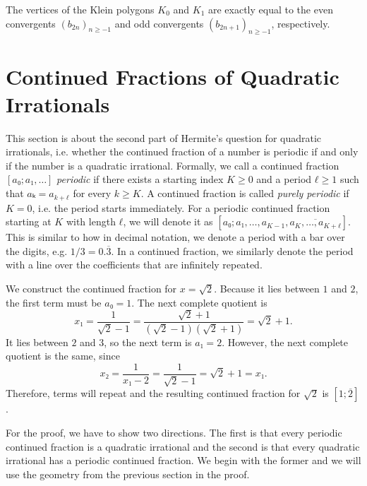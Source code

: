 \begin{corollary}
  The vertices of the Klein polygons $K_0$ and $K_1$ are exactly equal to the even
  convergents $(b_{2n})_{n ≥ -1}$ and odd convergents $(b_{2n+1})_{n ≥
  -1}$, respectively.
\end{corollary}

\section{Continued Fractions of Quadratic Irrationals}

This section is about the second part of Hermite's question for quadratic
irrationals, i.e. whether the continued fraction of a number is periodic if and only
if the number is a quadratic irrational.
Formally, we call a continued fraction $[a₀; a₁, …]$ \emph{periodic}
if there exists a starting index $K ≥ 0$ and a period $ℓ ≥ 1$ such that $aₖ = a_{k+ℓ}$ for every $k ≥ K$.
A continued fraction is called \emph{purely periodic} if $K = 0$,
i.e. the period starts immediately.
For a periodic continued fraction starting at $K$ with length $ℓ$,
we will denote it as $[a₀; a₁, …, a_{K-1}, \overline{a_K, …, a_{K+ℓ}}]$.
This is similar to how in decimal notation, we denote a period with a bar over the digits,
e.g. $1/3 = 0.\overline{3}$.
In a continued fraction, we similarly denote the period with a line over the
coefficients that are infinitely repeated.

\begin{example}
  We construct the continued fraction for $x = \sqrt{2}$.
  Because it lies between $1$ and $2$, the first term must be $a₀ = 1$.
  The next complete quotient is
  \[
    x₁ = \frac{1}{\sqrt{2} - 1} = \frac{\sqrt{2} + 1}{(\sqrt{2} - 1)(\sqrt{2} + 1)} = \sqrt{2} + 1.
  \]
  It lies between $2$ and $3$,
  so the next term is $a₁ = 2$.
  However, the next complete quotient is the same, since
  \[
    x₂ = \frac{1}{x₁ - 2} = \frac{1}{\sqrt{2} - 1} = \sqrt{2} + 1 = x₁.
  \]
  Therefore, terms will repeat and the resulting continued fraction for $\sqrt{2}$ is $[1; \overline{2}]$.
\end{example}

For the proof, we have to show two directions.
The first is that every periodic continued fraction is a quadratic irrational
and the second is that every quadratic irrational has a periodic continued fraction.
We begin with the former and we will use the geometry from the previous section
in the proof.


